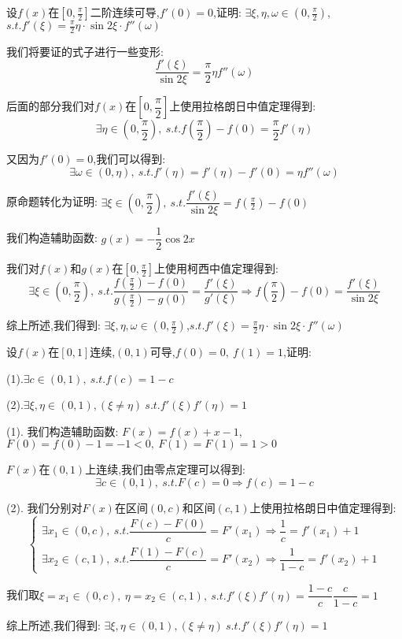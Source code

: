 \begin{proposition}
	设$f(x)$在$[0,\frac{\pi}{2}]$二阶连续可导,$f'(0)=0$,证明: $\exists \xi,\eta,\omega\in(0,\frac{\pi}{2})$,$s.t. f'(\xi)=\frac{\pi}{2}\eta\cdot \sin 2\xi\cdot f''(\omega)$
\end{proposition}
\begin{solution}

	我们将要证的式子进行一些变形:
	$$\dfrac{f'(\xi)}{\sin 2\xi}=\dfrac{\pi}{2}\eta f''(\omega)$$

	后面的部分我们对$f(x)$在$[0,\dfrac{\pi}{2}]$上使用拉格朗日中值定理得到:
	$$\exists \eta\in(0,\dfrac{\pi}{2}),\ s.t. f(\frac{\pi}{2})-f(0)=\frac{\pi}{2}f'(\eta)$$

	又因为$f'(0)=0$,我们可以得到:
	$$\exists \omega\in(0,\eta),\ s.t. f'(\eta)=f'(\eta)-f'(0)=\eta f''(\omega)$$

	原命题转化为证明: $\exists\xi\in(0,\dfrac{\pi}{2}),\ s.t. \dfrac{f'(\xi)}{\sin 2\xi}=f(\frac{\pi}{2})-f(0)$

	我们构造辅助函数: $g(x)=-\dfrac{1}{2}\cos 2x$

	我们对$f(x)$和$g(x)$在$[0,\frac{\pi}{2}]$上使用柯西中值定理得到:
	$$\exists\xi\in(0,\frac{\pi}{2}),\ s.t. \dfrac{f(\frac{\pi}{2})-f(0)}{g(\frac{\pi}{2})-g(0)}=\dfrac{f'(\xi)}{g'(\xi)}\Rightarrow f(\frac{\pi}{2})-f(0)=\dfrac{f'(\xi)}{\sin 2\xi}$$

	综上所述,我们得到: $\exists \xi,\eta,\omega\in(0,\frac{\pi}{2})$,$s.t. f'(\xi)=\frac{\pi}{2}\eta\cdot \sin 2\xi\cdot f''(\omega)$
\end{solution}


\begin{proposition}
	设$f(x)$在$[0,1]$连续,$(0,1)$可导,$f(0)=0,\ f(1)=1$,证明:

	(1).$\exists c\in(0,1),\ s.t. f(c)=1-c$

	(2).$\exists \xi,\eta\in(0,1),(\xi\neq \eta)\ s.t. f'(\xi)f'(\eta)=1$
\end{proposition}
\begin{solution}

	(1). 我们构造辅助函数: $F(x)=f(x)+x-1$,$F(0)=f(0)-1=-1<0,\ F(1)=F(1)=1>0$

	$F(x)$在$(0,1)$上连续,我们由零点定理可以得到:
	$$\exists c\in(0,1),\ s.t. F(c)=0\Rightarrow f(c)=1-c$$

	(2). 我们分别对$F(x)$在区间$(0,c)$和区间$(c,1)$上使用拉格朗日中值定理得到:
	$$\left\lbrace
		\begin{array}{l}
			\exists x_{1}\in(0,c),\ s.t. \dfrac{F(c)-F(0)}{c}=F'(x_{1})\Rightarrow \dfrac{1}{c}=f'(x_{1})+1 \\
			\exists x_{2}\in(c,1),\ s.t. \dfrac{F(1)-F(c)}{c}=F'(x_{2})\Rightarrow \dfrac{1}{1-c}=f'(x_{2})+1
		\end{array}
		\right. $$

	我们取$\xi=x_{1}\in(0,c),\ \eta=x_{2}\in(c,1),\ s.t. f'(\xi)f'(\eta)=\dfrac{1-c}{c}\dfrac{c}{1-c}=1$

	综上所述,我们得到: $\exists \xi,\eta\in(0,1),(\xi\neq \eta)\ s.t. f'(\xi)f'(\eta)=1$
\end{solution}

